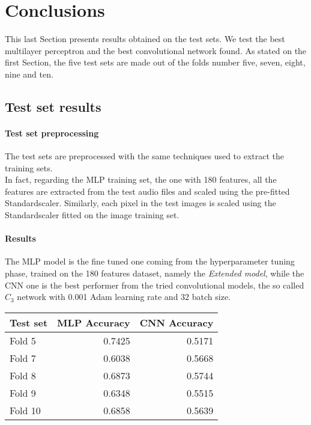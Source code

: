 \section{Conclusions}
\label{results}

This last Section presents results obtained on the test sets. 
We test the best multilayer perceptron and the best convolutional network found.
As stated on the first Section, the five test sets are made out of the 
folds number five, seven, eight, nine and ten.

\subsection{Test set results}

\paragraph{Test set preprocessing}
The test sets are preprocessed with the same techniques used to extract the training sets.\\
In fact, regarding the MLP training set, the one with 180 features, all the features are extracted 
from the test audio files and scaled using the pre-fitted Standardscaler.
Similarly, each pixel in the test images is scaled using the Standardscaler 
fitted on the image training set.

\paragraph{Results}
The MLP model is the fine tuned one coming from the hyperparameter tuning phase, 
trained on the 180 features dataset, namely the \emph{Extended model}, 
while the CNN one is the best performer from the tried convolutional models, 
the so called $C_3$ network with 0.001 Adam learning rate and 32 batch size.
\begin{center}
    \begin{tabular}{ |l|r|r| } 
        \hline
        Test set & MLP Accuracy & CNN Accuracy\\
        \hline
        Fold 5 & 0.7425 & 0.5171\\
        Fold 7 & 0.6038 & 0.5668\\
        Fold 8 & 0.6873 & 0.5744\\
        Fold 9 & 0.6348 & 0.5515\\
        Fold 10 & 0.6858 & 0.5639\\ 
        \hline
    \end{tabular}
\end{center}

